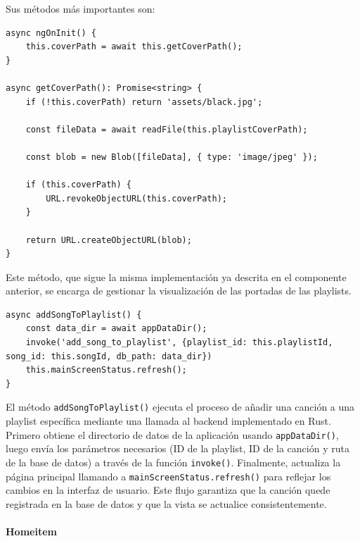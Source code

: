 \documentclass[11pt, a4paper]{article}
\begin{document}
                Sus métodos más importantes son:

                \begin{lstlisting}[caption={getCoverPath()}]
async ngOnInit() {
    this.coverPath = await this.getCoverPath();
}

async getCoverPath(): Promise<string> {
    if (!this.coverPath) return 'assets/black.jpg';

    const fileData = await readFile(this.playlistCoverPath);

    const blob = new Blob([fileData], { type: 'image/jpeg' });

    if (this.coverPath) {
        URL.revokeObjectURL(this.coverPath);
    }

    return URL.createObjectURL(blob);
}
                \end{lstlisting}

                Este método, que sigue la misma implementación ya descrita en el componente anterior, se encarga de gestionar la visualización de las portadas de las playlists.

                \begin{lstlisting}[caption={addSongToPlaylist()}]
async addSongToPlaylist() {
    const data_dir = await appDataDir();
    invoke('add_song_to_playlist', {playlist_id: this.playlistId, song_id: this.songId, db_path: data_dir})
    this.mainScreenStatus.refresh();
}
                \end{lstlisting}

                El método \texttt{addSongToPlaylist()} ejecuta el proceso de añadir una canción a una playlist específica mediante una llamada al backend implementado en Rust. Primero obtiene el directorio de datos de la aplicación usando \texttt{appDataDir()}, luego envía los parámetros necesarios (ID de la playlist, ID de la canción y ruta de la base de datos) a través de la función \texttt{invoke()}. Finalmente, actualiza la página principal llamando a \texttt{mainScreenStatus.refresh()} para reflejar los cambios en la interfaz de usuario. Este flujo garantiza que la canción quede registrada en la base de datos y que la vista se actualice consistentemente.

                \paragraph{Homeitem}
                ‎
\end{document}
